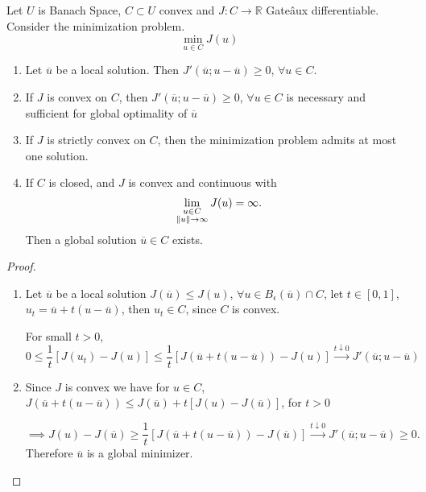 \begin{theorem}
	\label{theorem2. Banach Derivatives}
	Let $U$ is Banach Space, $C \subset U$ convex and $J: C \rightarrow \mathbb{R}$ Gate\^aux differentiable. Consider the minimization problem.
	\[
	 \min_{u\in C} J(u)
	\]
	\begin{enumerate}
		\item Let $\overline{u}$ be a local solution. Then $J'(\overline{u}; u-\overline{u})\geq 0$, $\forall u\in C$.
		\item If $J$ is convex on $C$, then $J'(\overline{u}; u-\overline{u})\geq 0$, $\forall u\in C$ is necessary and sufficient for global optimality of $\overline{u}$
		\item If $J$ is strictly convex on $C$, then the minimization problem admits at most one solution.
		\item If $C$ is closed, and $J$ is convex and continuous with
		\[
			\lim\limits_{\substack{u \in C\\ \left\lVert u\right\rVert\rightarrow \infty }}  J(u) = \infty.
		\] 
		Then a global solution $\overline{u} \in C$ exists.
	\end{enumerate}
\begin{proof}
	\
	\begin{enumerate}
		\item Let $\overline{u}$ be a local solution $J(\overline{u})\leq J(u)$, $\forall u \in B_\epsilon (\overline{u}) \cap C$, let $t\in[0,1]$, $u_t=\overline{u}+t(u-\overline{u})$, then $u_t \in C$, since $C$ is convex. 
		
		For small $t>0$, 
		\[
		 0\leq \frac{1}{t}\left[J(u_t)-J(u)\right]\leq\frac{1}{t}\left[J(\overline{u}+t(u-\overline{u}))-J(u)\right]\xrightarrow{t \downarrow 0} J'(\overline{u}; u-\overline{u})
		\]
		
		\item Since $J$ is convex we have for $u\in C$, $J(\overline{u}+t(u-\overline{u})) \leq J(\overline{u})+t\left[J(u)-J(\overline{u})\right]$, for $t>0$
		
	\[
		\implies 	J(u)-J(\overline{u})\geq\frac{1}{t}\left[J(\overline{u}+t(u-\overline{u}))-J(\overline{u})\right] \xrightarrow{t \downarrow 0} J'(\overline{u}; u-\overline{u}) \geq 0.
	\]
	Therefore $\overline{u}$ is a global minimizer.
	

\end{enumerate}
\end{proof}
\end{theorem}
